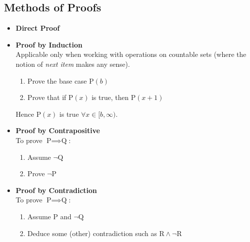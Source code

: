 \documentclass[a4paper,12pt]{article}
\let\emph\relax %
\begin{document}
\subsection{Methods of Proofs}
\begin{itemize}
    \item \textbf{Direct Proof}
    
    \item \textbf{Proof by Induction}\\
    Applicable only when working with operations on countable sets (where the
    notion of \textit{next item} makes any sense).
    \begin{enumerate}
        \item Prove the base case $\text{P}(b)$
        \item Prove that if $\text{P}(x)$ is true, then $\text{P}(x+1)$
    \end{enumerate}
    Hence $\text{P}(x)$ is true $\forall x \in [b, \infty)$.
    
    \item \textbf{Proof by Contrapositive}\\
    To prove $\text{P} \implies \text{Q}$:
    \begin{enumerate}
        \item Assume $\neg\text{Q}$
        \item Prove $\neg\text{P}$
    \end{enumerate}
    
    \item \textbf{Proof by Contradiction}\\
    To prove $\text{P} \implies \text{Q}$:
    \begin{enumerate}
        \item Assume \emph{both} $\text{P}$ and $\neg\text{Q}$
        \item Deduce some (other) contradiction such as $\text{R} \land \neg\text{R}$
    \end{enumerate}
    
\end{itemize}
\end{document}
